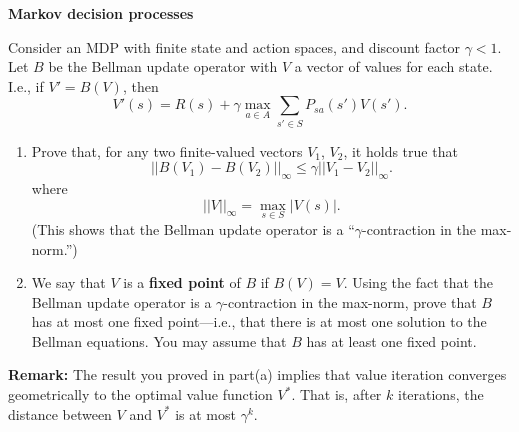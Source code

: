 \clearpage
\item {} {\bf Markov decision processes}

Consider an MDP with finite state and action spaces, and discount
factor $\gamma < 1$.  Let $B$ be the Bellman update operator with
$V$ a vector of values for each state. I.e., if $V' = B(V)$, then
\[
V'(s) = R(s) + \gamma \max_{a\in A} \sum_{s'\in S} P_{sa}(s')
V(s').
\]

\begin{enumerate}
\item {} Prove that, for any two finite-valued vectors $V_1$, 
$V_2$, it
holds true that
\[
   ||B(V_1) - B(V_2)||_\infty \leq \gamma ||V_1 - V_2||_\infty.
\]
where
\[
   ||V||_\infty = \max_{s \in S} |V(s)|.
\]
(This shows that the Bellman update operator is a
``$\gamma$-contraction in the max-norm.'')

\item {} We say that $V$ is a {\bf fixed point} of $B$ if
$B(V) = V$. Using the fact that the Bellman update operator is a
$\gamma$-contraction in the max-norm, prove that $B$ has at most
one fixed point---i.e., that there is at most one solution to the
Bellman equations.  You may assume that $B$ has at least one fixed
point.

\end{enumerate}

\textbf{Remark:} The result you proved in part(a) implies that value iteration converges geometrically to the optimal value function $V^*$. That is, after $k$ iterations, the distance between $V$ and $V^*$ is at most $\gamma^k$.


